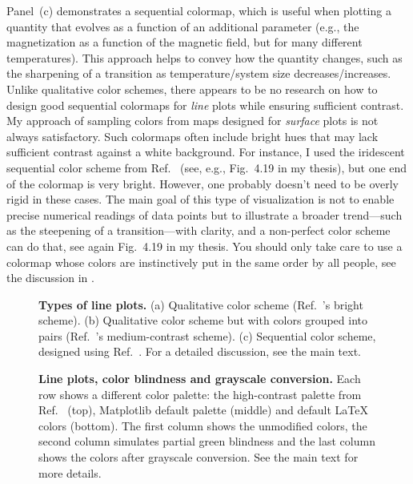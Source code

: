Panel~(c) demonstrates a sequential colormap, which is useful when plotting a quantity that evolves as a function of an additional parameter (e.g., the magnetization as a function of the magnetic field, but for many different temperatures). This approach helps to convey how the quantity changes, such as the sharpening of a transition as temperature/system size decreases/increases.
Unlike qualitative color schemes, there appears to be no research on how to design good sequential colormaps for \emph{line} plots while ensuring sufficient contrast. My approach of sampling colors from maps designed for \emph{surface} plots is not always satisfactory. Such colormaps often include bright hues that may lack sufficient contrast against a white background. For instance, I used the iridescent sequential color scheme from Ref.~\cite{paultol} (see, e.g., Fig.~4.19 in my thesis), but one end of the colormap is very bright. However, one probably doesn't need to be overly rigid in these cases. The main goal of this type of visualization is not to enable precise numerical readings of data points but to illustrate a broader trend---such as the steepening of a transition---with clarity, and a non-perfect color scheme can do that, see again Fig.~4.19 in my thesis. You should only take care to use a colormap whose colors are instinctively put in the same order by all people, see the discussion in .

\begin{figure}
	\centering
	
	\caption{\textbf{Types of line plots.} (a) Qualitative color scheme (Ref.~\cite{paultol}'s bright scheme). (b) Qualitative color scheme but with colors grouped into pairs (Ref.~\cite{paultol}'s medium-contrast scheme). (c) Sequential color scheme, designed using Ref.~\cite{chromajs}. For a detailed discussion, see the main text.}
	\label{fig:lineplotflavour}
\end{figure}


\begin{figure}
	\centering 
	
	\caption{\textbf{Line plots, color blindness and grayscale conversion.} Each row shows a different color palette: the high-contrast palette from Ref.~\cite{paultol} (top), Matplotlib default palette (middle) and default \LaTeX{} colors (bottom). The first column shows the unmodified colors, the second column simulates partial green blindness and the last column shows the colors after grayscale conversion. See the main text for more details.}
	\label{fig:lineplotcolorblindness}
\end{figure}

